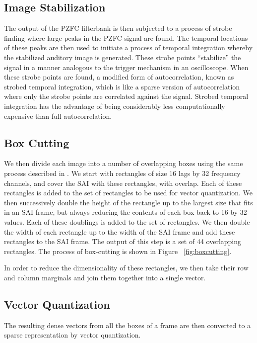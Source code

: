 \subsection{Image Stabilization}

The output of the PZFC filterbank is then subjected to a process of
strobe finding where large peaks in the PZFC signal are found.  The
temporal locations of these peaks are then used to initiate a process
of temporal integration whereby the stabilized auditory image is
generated.  These strobe points ``stabilize'' the signal in a manner
analogous to the trigger mechanism in an oscilloscope.  When these
strobe points are found, a modified form of autocorrelation, known as
strobed temporal integration, which is like a sparse version of
autocorrelation where only the strobe points are correlated against
the signal. Strobed temporal integration has the advantage of being
considerably less computationally expensive than full autocorrelation.

\subsection{Box Cutting}

We then divide each image into a number of overlapping boxes using the
same process described in \cite{lyon10}.  We start with rectangles
of size 16 lags by 32 frequency channels, and cover the SAI with these 
rectangles, with overlap.  Each of
these rectangles is added to the set of rectangles to be used for
vector quantization.  We then successively double the height of the rectangle 
up to the largest size that fits in an SAI frame, but always reducing the 
contents of each box back to 16 by 32 values.  Each of these doublings
is added to the set of rectangles.  We then double the width of each
rectangle up to the width of the SAI frame and add these rectangles to
the SAI frame.  The output of this step is a set of 44 overlapping
rectangles. The process of box-cutting is shown in Figure 
~\ref{fig:boxcutting}.

In order to reduce the dimensionality of these rectangles, we then
take their row and column marginals and join them together into a
single vector.

\subsection{Vector Quantization}

The resulting dense vectors from all the boxes of a frame are then converted 
to a sparse representation by vector quantization.  

